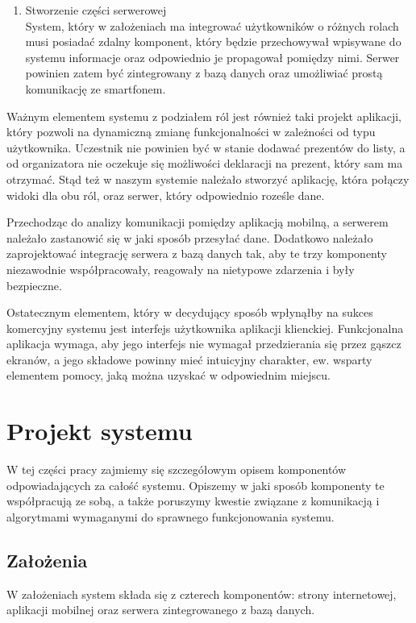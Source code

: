 \documentclass[10pt,titlepage]{article}
\begin{document}
\begin{enumerate}
 \item Stworzenie części serwerowej
 \\ System, który w założeniach ma integrować użytkowników o różnych rolach musi posiadać zdalny komponent, który będzie przechowywał wpisywane do systemu informacje
 oraz odpowiednio je propagował pomiędzy nimi. Serwer powinien zatem być zintegrowany z bazą danych oraz umożliwiać prostą komunikację ze smartfonem.
\end{enumerate}


Ważnym elementem systemu z podziałem ról jest również taki projekt aplikacji, który pozwoli na dynamiczną zmianę funkcjonalności w zależności od typu użytkownika. Uczestnik
nie powinien być w stanie dodawać prezentów do listy, a od organizatora nie oczekuje się możliwości deklaracji na prezent, który sam ma otrzymać. Stąd też w naszym systemie
należało stworzyć aplikację, która połączy widoki dla obu ról, oraz serwer, który odpowiednio roześle dane.

Przechodząc do analizy komunikacji pomiędzy aplikacją mobilną, a serwerem należało zastanowić się w jaki sposób przesyłać dane. Dodatkowo należało zaprojektować integrację
serwera z bazą danych tak, aby te trzy komponenty niezawodnie współpracowały, reagowały na nietypowe zdarzenia i były bezpieczne.

Ostatecznym elementem, który w decydujący sposób wpłynąłby na sukces komercyjny systemu jest interfejs użytkownika aplikacji klienckiej. Funkcjonalna aplikacja wymaga, aby
jego interfejs nie wymagał przedzierania się przez gąszcz ekranów, a jego składowe powinny mieć intuicyjny charakter, ew. wsparty elementem pomocy, jaką można uzyskać w odpowiednim
miejscu.

\newpage
\section{Projekt systemu}
W tej części pracy zajmiemy się szczegółowym opisem komponentów odpowiadających za całość systemu. Opiszemy w jaki sposób komponenty te współpracują ze sobą, a także 
poruszymy kwestie związane z komunikacją i algorytmami wymaganymi do sprawnego funkcjonowania systemu.

\subsection{Założenia}
W założeniach system składa się z czterech komponentów: strony internetowej, aplikacji mobilnej oraz serwera zintegrowanego z bazą danych.
\end{document}
